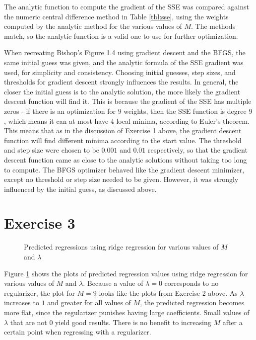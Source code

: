 \documentclass[10pt]{article}
\begin{document}
The analytic function to compute the gradient of the SSE was compared against the numeric central difference method in Table \ref{tbl:sse}, using the weights computed by the analytic method for the various values of $M$. The methods match, so the analytic function is a valid one to use for further optimization.

When recreating Bishop's Figure 1.4 using gradient descent and the \textsc{BFGS}, the same initial guess was given, and the analytic formula of the SSE gradient was used, for simplicity and consistency. Choosing initial guesses, step sizes, and thresholds for gradient descent strongly influences the results. In general, the closer the initial guess is to the analytic solution, the more likely the gradient descent function will find it. This is because the gradient of the SSE has multiple zeros - if there is an optimization for $9$ weights, then the SSE function is degree $9$, which means it can at most have $4$ local minima, according to Euler's theorem. This means that as in the discussion of Exercise 1 above, the gradient descent function will find different minima according to the start value. The threshold and step size were chosen to be $0.001$ and $0.01$ respectively, so that the gradient descent function came as close to the analytic solutions without taking too long to compute. The \textsc{BFGS} optimizer behaved like the gradient descent minimizer, except no threshold or step size needed to be given. However, it was strongly influenced by the initial guess, as discussed above.

\section{Exercise 3}

\begin{figure}[!ht]
	\centering
	\caption{Predicted regressions using ridge regression for various values of $M$ and $\lambda$}
	\label{fig:3-1}
\end{figure}

Figure \ref{fig:3-1} shows the plots of predicted regression values using ridge regression for various values of $M$ and $\lambda$. Because a value of $\lambda=0$ corresponds to no regularizer, the plot for $M=9$ looks like the plots from Exercise 2 above. As $\lambda$ increases to $1$ and greater for all values of $M$, the predicted regression becomes more flat, since the regularizer punishes having large coefficients. Small values of $\lambda$ that are not $0$ yield good results. There is no benefit to increasing $M$ after a certain point when regressing with a regularizer.
\end{document}
